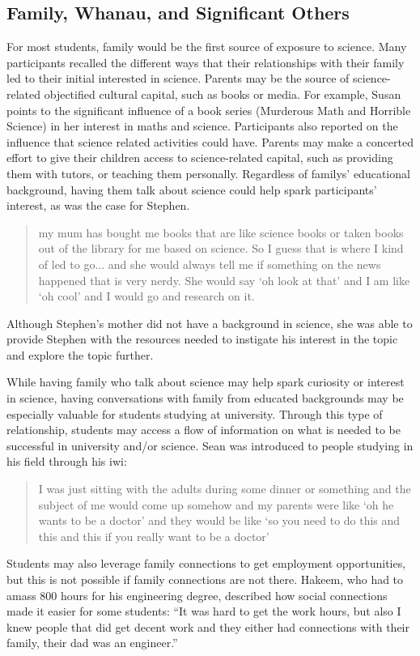 \subsection{Family, Whanau, and Significant Others}
For most students, family would be the first source of exposure to science. Many participants recalled the different ways that their relationships with their family led to their initial interested in science. Parents may be the source of science-related objectified cultural capital, such as books or media. For example, Susan points to the significant influence of a book series (Murderous Math and Horrible Science) in her interest in maths and science. Participants also reported on the influence that science related activities could have. Parents may make a concerted effort to give their children access to science-related capital, such as providing them with tutors, or teaching them personally.   Regardless of familys' educational background, having them talk about science could help spark participants' interest, as was the case for Stephen.  \blockquote{my mum has bought me books that are like science books or taken books out of the library for me based on science. So I guess that is where I kind of led to go... and she would always tell me if something on the news happened that is very nerdy. She would say `oh look at that' and I am like `oh cool' and I would go and research on it.} Although Stephen's mother did not have a background in science, she was able to provide Stephen with the resources needed to instigate his interest in the topic and explore the topic further.

While having family who talk about science may help spark curiosity or interest in science, having conversations with family from educated backgrounds may be especially valuable for students studying at university. Through this type of relationship, students may access a flow of information on what is needed to be successful in university and/or science. Sean was introduced to people studying in his field through his iwi: \blockquote{I was just sitting with the adults during some dinner or something and the subject of me would come up somehow and my parents were like `oh he wants to be a doctor' and they would be like `so you need to do this and this and this if you really want to be a doctor'}. Students may also leverage family connections to get employment opportunities, but this is not possible if family connections are not there. Hakeem, who had to amass 800 hours for his engineering degree, described how social connections made it easier for some students: ``It was hard to get the work hours, but also I knew people that did get decent work and they either had connections with their family, their dad was an engineer.'' 


